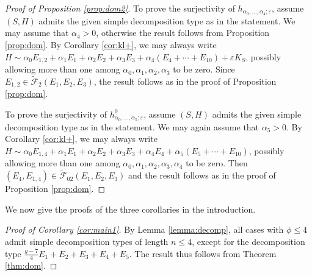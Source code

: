 \documentclass[11pt]{amsart}
\theoremstyle{definition}
\def\F{{\mathcal F}}
\begin{document}
 






\begin{proof}[Proof of Proposition \ref{prop:dom2}]
 To prove the surjectivity of  \color{black} $h_{\alpha_0,\ldots,\alpha_4;\varepsilon}$\color{black}, assume  
$(S,H)$  admits  the given simple decomposition type as in the statement. We may assume that $\alpha_4>0$, otherwise the result follows from Proposition \ref{prop:dom}. By   Corollary \ref{cor:kl+},   we may always write $H \sim \alpha_0E_{1,2}+\alpha_1E_1+\alpha_2E_2+\alpha_3E_3+\alpha_4(E_4+\cdots+E_{10})+\varepsilon K_S$, possibly allowing more than one among $\alpha_0,\alpha_1,\alpha_2,\alpha_3$ to be zero. Since $E_{1,2} \in \widetilde{\F}_2(E_1,E_2,E_3)$, the result follows as in the proof of Proposition \ref{prop:dom}. 

To prove the surjectivity of $h^0_{\alpha_0,\ldots,\alpha_5;\varepsilon}$, assume 
$(S,H)$  admits  the given simple decomposition type as in the statement. We may again assume that $\alpha_5>0$. By   Corollary \ref{cor:kl+},   we may always write $H \sim \alpha_0E_{1,4}+\alpha_1E_1+\alpha_2E_2+\alpha_3E_3+\alpha_4E_4+\alpha_5(E_5+\cdots+E_{10})$, possibly allowing more than one among $\alpha_0,\alpha_1,\alpha_2,\alpha_3,\alpha_4$ to be zero. Then $(E_4,E_{1,4}) \in \widetilde{\F}_{02}(E_1,E_2,E_3)$ and the result follows as in the proof of Proposition \ref{prop:dom}. 
\end{proof}


 


We now give the proofs of the three corollaries in the introduction.



\begin{proof}[Proof of Corollary \ref{cor:main1}]
  By Lemma \ref{lemma:decomp}, all cases with $\phi \leqslant 4$  admit  simple decomposition types of length $n\leqslant 4$, except for the decomposition type $\frac{g-7}{4}E_1+E_{2}+E_{3}+E_4+E_5$. The result thus follows from Theorem \ref{thm:dom}. 
\end{proof}
\end{document}
